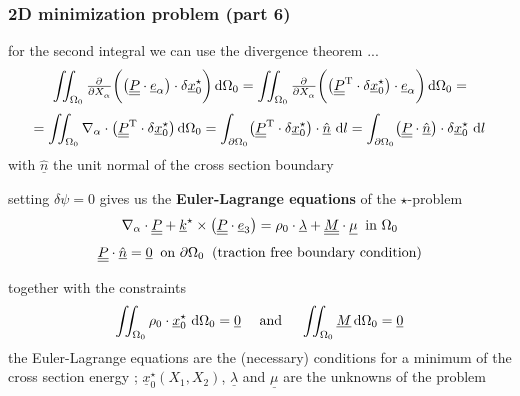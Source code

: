 \begin{frame}
  \frametitle{2D minimization problem (part 6)}

  for the second integral we can use the divergence theorem ...
  \begin{displaymath}
    \iint_{\Omega_0}
      \pd{}{X_{\alpha}} \biggl( \bigl( \doubleunderline{P} \cdot \underline{e}_{\alpha} \bigr) \cdot \delta \underline{x}_0^{\star} \biggr)
    \dif \Omega_0 =
    \iint_{\Omega_0}
      \pd{}{X_{\alpha}} \biggl( \bigl( \doubleunderline{P}^{\mathrm{T}} \cdot \delta \underline{x}_0^{\star} \bigr) \cdot \underline{e}_{\alpha} \biggr)
    \dif \Omega_0 =
  \end{displaymath}
  \begin{displaymath}
    = \iint_{\Omega_0}
      \nabla_{\alpha} \cdot \bigl( \doubleunderline{P}^{\mathrm{T}} \cdot \delta \underline{x}_0^{\star} \bigr)
    \dif \Omega_0 =
    \int_{\partial \Omega_0}
      \bigl( \doubleunderline{P}^{\mathrm{T}} \cdot \delta \underline{x}_0^{\star} \bigr) \cdot \underline{\hat{n}} \,
    \dif l =
    \int_{\partial \Omega_0}
      \bigl( \doubleunderline{P} \cdot \underline{\hat{n}} \bigr) \cdot \delta \underline{x}_0^{\star} \,
    \dif l
  \end{displaymath}
  with $\underline{\hat{n}}$ the unit normal of the cross section boundary
  
  \vspace{1em}
  setting $\delta \psi = 0$ gives us the \textbf{Euler-Lagrange equations} of the $\star$-problem
  \begin{displaymath}
    \nabla_{\alpha} \cdot \underline{\underline{P}} +
    \underline{k}^{\star} \times \bigl( \underline{\underline{P}} \cdot \underline{e}_3 \bigr) =
    \rho_0 \cdot \underline{\lambda} +
    \underline{\underline{M}} \cdot \underline{\mu}
    \: \text{ in } \Omega_0    
  \end{displaymath}
  \begin{displaymath}
    \underline{\underline{P}} \cdot \underline{\hat{n}} = \underline{0}
    \: \text{ on } \partial \Omega_0
    \: \text{ (traction free boundary condition)}
  \end{displaymath}
  
  \vspace{1em}
  together with the constraints
  \begin{displaymath}
    \iint_{\Omega_0} \rho_0 \cdot \underline{x}_0^{\star} \, \dif \Omega_0 = \underline{0}
    \quad \text{ and } \quad
    \iint_{\Omega_0} \underline{M} \dif \Omega_0 = \underline{0}
  \end{displaymath}
  the Euler-Lagrange equations are the (necessary) conditions for a minimum of the cross section energy ; $\underline{x}_0^{\star}(X_1,X_2)$, $\underline{\lambda}$ and $\underline{\mu}$ are the unknowns of the problem
\end{frame}